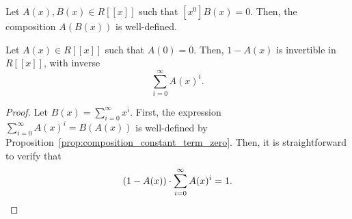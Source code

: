 \begin{proposition} \label{prop:composition_constant_term_zero}
    Let \(A(x), B(x) \in R[[x]]\) such that \([x^0] B(x) = 0\).
    Then, the composition \(A(B(x))\) is well-defined.
\end{proposition}

\begin{proposition}
    Let \(A(x) \in R[[x]]\) such that \(A(0) = 0\).
    Then, \(1 - A(x)\) is invertible in \(R[[x]]\), with inverse
    \begin{equation}
        \sum_{i=0}^\infty A(x)^i.
    \end{equation}
\end{proposition}

\begin{proof}
    Let \(B(x) = \sum_{i=0}^\infty x^i\).
    First, the expression \(\sum_{i=0}^\infty A(x)^i = B(A(x))\) is well-defined by Proposition~\ref{prop:composition_constant_term_zero}.
    Then, it is straightforward to verify that
    \begin{equation}
        (1 - A(x)) \cdot \sum_{i=0}^\infty A(x)^i = 1. \qedhere
    \end{equation}
\end{proof}